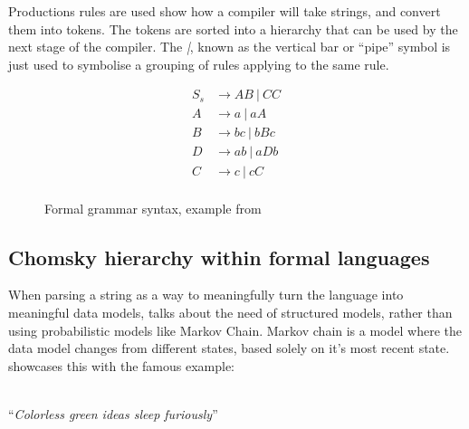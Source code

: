 Productions rules are used show how a compiler will take strings, and convert them into tokens. The tokens are sorted into a hierarchy that can be used by the next stage of the compiler. The \emph{|}, known as the vertical bar or ``pipe'' symbol is just used to symbolise a grouping of rules applying to the same rule.

\begin{figure}[ht!]
    \begin{align*}
    S_s &\rightarrow AB\ |\ CC \\
    A &\rightarrow a\ |\ aA \\
    B &\rightarrow bc\ |\ bBc \\
    D &\rightarrow ab\ |\ aDb \\
    C &\rightarrow c\ |\ cC \\
    \end{align*}
    \caption{Formal grammar syntax, example from \autocite{ParseTech}}
    \label{fig:formalGrammar}
\end{figure}

\subsection{Chomsky hierarchy within formal languages}

When parsing a string as a way to meaningfully turn the language into meaningful data models, \autocite{Chomsky} talks about the need of structured models, rather than using probabilistic models like Markov Chain. Markov chain is a model where the data model changes from different states, based solely on it's most recent state. \autocite{Chomsky} showcases this with the famous example: \\\\ \centerline{``\emph{Colorless green ideas sleep furiously}''} \\

